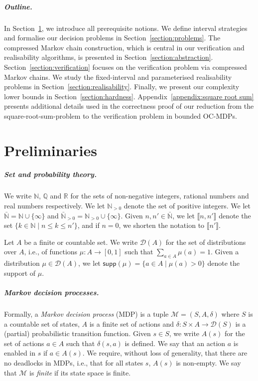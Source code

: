 \documentclass[a4paper,UKenglish,cleveref,autoref,thm-restate,colorlinks]{lipics-v2021}
\newcommand{\integerInterval}[1]{\llbracket{}#1\rrbracket{}}
\newcommand{\IR}{\mathbb{R}}
\newcommand{\IN}{\mathbb{N}}
\newcommand{\INpos}{\IN_{>0}}
\newcommand{\IQ}{\mathbb{Q}}
\newcommand{\INbar}{\bar{\IN}}
\newcommand{\INposBar}{\bar{\IN}_{>0}}
\newcommand{\dist}[1]{\mathcal{D}(#1)}
\newcommand{\supp}[1]{\mathsf{supp}(#1)}
\newcommand{\mdp}{\mathcal{M}}
\newcommand{\mdpStateSpace}{S}
\newcommand{\mdpState}{s}
\newcommand{\mdpActionSpace}{A}
\newcommand{\mdpAction}{a}
\newcommand{\mdpTrans}{\delta}
\newcommand{\mdpTuple}{(\mdpStateSpace, \mdpActionSpace, \mdpTrans)}
\newcommand{\ocCount}{k}
\begin{document}
\subparagraph*{Outline.}
In Section~\ref{section:preliminaries}, we introduce all prerequisite notions.
We define interval strategies and formalise our decision problems in Section~\ref{section:problems}.
The compressed Markov chain construction, which is central in our verification and realisability algorithms, is presented in Section~\ref{section:abstraction}.
Section~\ref{section:verification} focuses on the verification problem via compressed Markov chains.
We study the fixed-interval and parameterised realisability problems in Section~\ref{section:realisability}.
Finally, we present our complexity lower bounds in Section~\ref{section:hardness}.
Appendix~\ref{appendix:square root sum} presents additional details used in the correctness proof of our reduction from the square-root-sum-problem to the verification problem in bounded OC-MDPs.

 
\section{Preliminaries}\label{section:preliminaries}
\subparagraph*{Set and probability theory.} We write $\IN$, $\IQ$ and $\IR$ for the sets of non-negative integers, rational numbers and real numbers respectively.
We let  $\INpos$ denote the set of positive integers.
We let $\INbar = \IN\cup\{\infty\}$ and $\INposBar = \INpos\cup\{\infty\}$.
Given $n, n'\in\INbar$, we let $\integerInterval{n, n'}$ denote the set $\{\ocCount\in\IN\mid n\leq\ocCount\leq n'\}$, and if $n=0$, we shorten the notation to $\integerInterval{n'}$.


Let $A$ be a finite or countable set.
We write $\dist{A}$ for the set of distributions over $A$, i.e., of functions $\mu\colon A\to [0, 1]$ such that $\sum_{a\in A}\mu(a) = 1$.
Given a distribution $\mu\in\dist{A}$, we let $\supp{\mu} = \{a\in A\mid \mu(a) > 0\}$ denote the support of $\mu$.

\subparagraph*{Markov decision processes.}
Formally, a \textit{Markov decision process} (MDP) is a tuple $\mdp = \mdpTuple$ where $\mdpStateSpace$ is a countable set of states, $\mdpActionSpace$ is a finite set of actions and $\mdpTrans\colon \mdpStateSpace\times \mdpActionSpace\to \dist{\mdpStateSpace}$ is a (partial) probabilistic transition function.
Given $\mdpState\in\mdpStateSpace$, we write $\mdpActionSpace(\mdpState)$ for the set of actions $\mdpAction\in\mdpActionSpace$ such that $\mdpTrans(\mdpState,\mdpAction)$ is defined.
We say that an action $\mdpAction$ is enabled in $\mdpState$ if $\mdpAction\in\mdpActionSpace(\mdpState)$.
We require, without loss of generality, that there are no deadlocks in MDPs, i.e., that for all states $\mdpState$, $\mdpActionSpace(\mdpState)$ is non-empty.
We say that $\mdp$ is \textit{finite} if its state space is finite.
\end{document}

